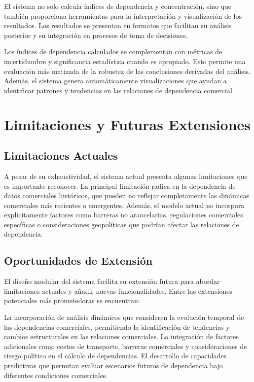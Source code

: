 \documentclass[authoryear]{elsarticle}
\begin{document}
El sistema no solo calcula índices de dependencia y concentración, sino que también proporciona herramientas para la interpretación y visualización de los resultados. Los resultados se presentan en formatos que facilitan su análisis posterior y su integración en procesos de toma de decisiones.

Los índices de dependencia calculados se complementan con métricas de incertidumbre y significancia estadística cuando es apropiado. Esto permite una evaluación más matizada de la robustez de las conclusiones derivadas del análisis. Además, el sistema genera automáticamente visualizaciones que ayudan a identificar patrones y tendencias en las relaciones de dependencia comercial.

\section{Limitaciones y Futuras Extensiones}

\subsection{Limitaciones Actuales}

A pesar de su exhaustividad, el sistema actual presenta algunas limitaciones que es importante reconocer. La principal limitación radica en la dependencia de datos comerciales históricos, que pueden no reflejar completamente las dinámicas comerciales más recientes o emergentes. Además, el modelo actual no incorpora explícitamente factores como barreras no arancelarias, regulaciones comerciales específicas o consideraciones geopolíticas que podrían afectar las relaciones de dependencia.

\subsection{Oportunidades de Extensión}

El diseño modular del sistema facilita su extensión futura para abordar limitaciones actuales y añadir nuevas funcionalidades. Entre las extensiones potenciales más prometedoras se encuentran:

La incorporación de análisis dinámicos que consideren la evolución temporal de las dependencias comerciales, permitiendo la identificación de tendencias y cambios estructurales en las relaciones comerciales. La integración de factores adicionales como costos de transporte, barreras comerciales y consideraciones de riesgo político en el cálculo de dependencias. El desarrollo de capacidades predictivas que permitan evaluar escenarios futuros de dependencia bajo diferentes condiciones comerciales.
\end{document}
